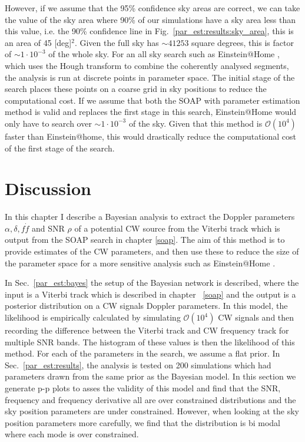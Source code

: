 However, if we assume that the 95\% confidence sky areas are correct, we can take the value of the sky area where 90\% of our simulations have a sky area less than this value, i.e. the 90\% confidence line in Fig.~\ref{par_est:results:sky_area}, this is an area of 45 [deg]$^2$.
Given the full sky has $\sim 41253$ square degrees, this is factor of $\sim 1 \cdot 10^{-3}$ of the whole sky.
For an all sky search such as Einstein@Home \citep{theligoscientificcollaborationandthevirgocollaboration2013EinsteinHome,singh2016ResultsAllsky}, which uses the Hough transform \citep{krishnan2004HoughTransform} to combine the coherently analysed segments, the analysis is run at discrete points in parameter space. The initial stage of the search places these points on a coarse grid in sky positions to reduce the computational cost.
 If we assume that both the SOAP with parameter estimation method is valid and replaces the first stage in this search, Einstein@Home would only have to search over $\sim 1 \cdot 10^{-3}$ of the sky. 
 Given that this method is $\mathcal{O}(10^4)$ faster than Einstein@home, this would drastically reduce the computational cost of the first stage of the search. 



%
%
\section{Discussion}
%
%

In this chapter I describe a Bayesian analysis to extract the Doppler parameters $\alpha, \delta, f \dot{f}$ and \gls{SNR} $\rho$ of a potential \gls{CW} source from the Viterbi track which is output from the SOAP search in chapter \ref{soap}.
The aim of this method is to provide estimates of the \gls{CW} parameters, and then use these to reduce the size of the parameter space for a more sensitive analysis such as Einstein@Home \citep{singh2016ResultsAllsky}. 

In Sec.~\ref{par_est:bayes} the setup of the Bayesian network is described, where the input is a Viterbi track which is described in chapter ~\ref{soap} and the output is a posterior distribution on a \gls{CW} signals Doppler parameters.
In this model, the likelihood is empirically calculated by simulating $\mathcal{O}(10^4)$ \gls{CW} signals and then recording the difference between the Viterbi track and \gls{CW} frequency track for multiple \gls{SNR} bands. 
The histogram of these values is then the likelihood of this method.
For each of the parameters in the search, we assume a flat prior.
In Sec.~\ref{par_est:results}, the analysis is tested on 200 simulations which had parameters drawn from the same prior as the Bayesian model.
In this section we generate p-p plots to asses the validity of this model and find that the \gls{SNR}, frequency and frequency derivative all are over constrained distributions and the sky position parameters are under constrained.
However, when looking at the sky position parameters more carefully, we find that the distribution is bi modal where each mode is over constrained.

